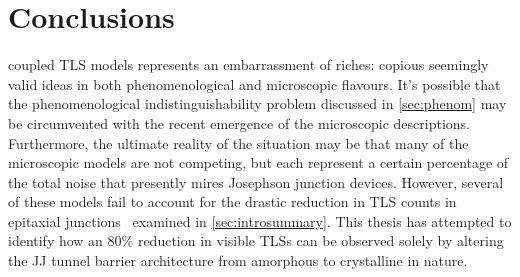 \chapter{Conclusions}\label{ch:conclusions}

 coupled TLS models represents an embarrassment of riches: copious seemingly valid ideas in both phenomenological and microscopic flavours.
It's possible that the phenomenological indistinguishability problem discussed in \cref{sec:phenom} may be circumvented with the recent emergence of the microscopic descriptions.
Furthermore, the ultimate reality of the situation may be that many of the microscopic models are not competing, but each represent a certain percentage of the total noise that presently mires Josephson junction devices.
However, several of these models fail to account for the drastic reduction in TLS counts in epitaxial junctions~\cite{Oh2006} examined in \cref{sec:introsummary}.
This thesis has attempted to identify how an 80\% reduction in visible TLSs can be observed solely by altering the JJ tunnel barrier architecture from amorphous to crystalline in nature.

